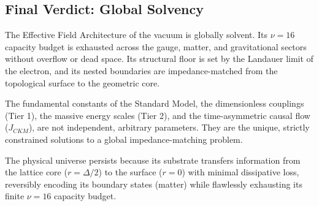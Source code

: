 \subsection{Final Verdict: Global Solvency}
The Effective Field Architecture of the vacuum is globally solvent. Its $\nu = 16$ capacity budget is exhausted across the gauge, matter, and gravitational sectors without overflow or dead space. Its structural floor is set by the Landauer limit of the electron, and its nested boundaries are impedance-matched from the topological surface to the geometric core.

The fundamental constants of the Standard Model, the dimensionless couplings (Tier 1), the massive energy scales (Tier 2), and the time-asymmetric causal flow ($J_{CKM}$), are not independent, arbitrary parameters. They are the unique, strictly constrained solutions to a global impedance-matching problem. 

The physical universe persists because its substrate transfers information from the lattice core ($r = \Delta/2$) to the surface ($r = 0$) with minimal dissipative loss, reversibly encoding its boundary states (matter) while flawlessly exhausting its finite $\nu=16$ capacity budget.